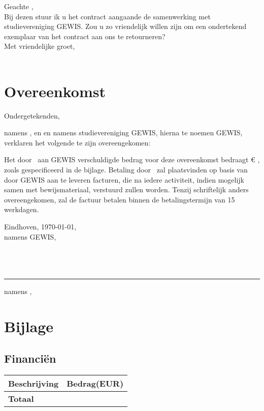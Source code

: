 \documentclass[
 digital,         %
]{GEWISLetter}
\newcommand{\GEWIScontact}{%
\\%
}
\newcommand{\COMPANYcontact}{%
}
\begin{document}
\GEWISfirstpage                 %
\printadresenkenmerk            %

Geachte %
,\\[2\baselineskip]
Bij dezen stuur ik u het contract aangaande de samenwerking met studievereniging GEWIS. Zou u zo vriendelijk willen zijn om een ondertekend exemplaar van het contract aan ons te retourneren?
\\[2\baselineskip]

Met vriendelijke groet,\\[2\baselineskip]
\GEWIScontact

\section{Overeenkomst}
Ondergetekenden, \COMPANYcontact
namens \GEWISRecipient, en %
 en %
 namens studievereniging GEWIS, hierna te noemen GEWIS, verklaren het volgende te zijn overeengekomen:
 \begin{itemize}
 \end{itemize}
Het door \GEWISRecipient\ aan GEWIS verschuldigde bedrag voor deze overeenkomst bedraagt \euro{}%
, zoals gespecificeerd in de bijlage. Betaling door \GEWISRecipient\ zal plaatsvinden op basis van door GEWIS aan te leveren facturen, die na iedere activiteit, indien mogelijk samen met bewijsmateriaal, verstuurd zullen worden. Tenzij schriftelijk anders overeengekomen, zal \GEWISRecipient de factuur betalen binnen de betalingstermijn van 15 werkdagen.
\\[2\baselineskip]
\begin{minipage}[t]{0.4\textwidth}
Eindhoven, \today,\\
namens GEWIS,
\\[3\baselineskip]
\\
\\[3\baselineskip]
\\
\end{minipage}
\hfill
\begin{minipage}[t]{0.4\textwidth}
\rule{\textwidth}{0.4pt}
namens \GEWISRecipient,\\[3\baselineskip]
\COMPANYcontact
\end{minipage}

 
\section{Bijlage}

\subsection{Financi\"en}
\begin{tabularx}{\textwidth}{X r}\toprule
	Beschrijving           & Bedrag(EUR)\\\midrule
    \cmidrule{2-2} \textbf{Totaal} & {\bfseries %
    }\\\bottomrule
\end{tabularx}
\end{document}
